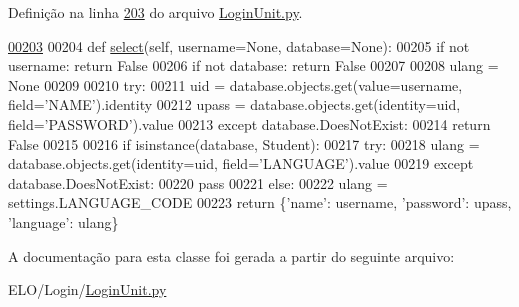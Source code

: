Definição na linha \hyperlink{LoginUnit_8py_source_l00203}{203} do arquivo \hyperlink{LoginUnit_8py_source}{Login\-Unit.\-py}.


\begin{DoxyCode}
\hypertarget{classLogin_1_1LoginUnit_1_1PersLogin_l00203}{}\hyperlink{classLogin_1_1LoginUnit_1_1PersLogin_a1847dbd744377283add2327d2eb0b99f}{00203} 
00204     \textcolor{keyword}{def }\hyperlink{classLogin_1_1LoginUnit_1_1PersLogin_a1847dbd744377283add2327d2eb0b99f}{select}(self, username=None, database=None):
00205         \textcolor{keywordflow}{if} \textcolor{keywordflow}{not} username: \textcolor{keywordflow}{return} \textcolor{keyword}{False}
00206         \textcolor{keywordflow}{if} \textcolor{keywordflow}{not} database: \textcolor{keywordflow}{return} \textcolor{keyword}{False}
00207 
00208         ulang = \textcolor{keywordtype}{None}
00209 
00210         \textcolor{keywordflow}{try}:
00211             uid = database.objects.get(value=username, field=\textcolor{stringliteral}{'NAME'}).identity
00212             upass = database.objects.get(identity=uid, field=\textcolor{stringliteral}{'PASSWORD'}).value
00213         \textcolor{keywordflow}{except} database.DoesNotExist:
00214             \textcolor{keywordflow}{return} \textcolor{keyword}{False}
00215 
00216         \textcolor{keywordflow}{if} isinstance(database, Student):
00217             \textcolor{keywordflow}{try}:
00218                 ulang = database.objects.get(identity=uid, field=\textcolor{stringliteral}{'LANGUAGE'}).value
00219             \textcolor{keywordflow}{except} database.DoesNotExist:
00220                 \textcolor{keywordflow}{pass}
00221         \textcolor{keywordflow}{else}:
00222             ulang = settings.LANGUAGE\_CODE
00223 
        \textcolor{keywordflow}{return} \{\textcolor{stringliteral}{'name'}: username, \textcolor{stringliteral}{'password'}: upass, \textcolor{stringliteral}{'language'}: ulang\}\end{DoxyCode}


A documentação para esta classe foi gerada a partir do seguinte arquivo\-:\begin{DoxyCompactItemize}
\item 
E\-L\-O/\-Login/\hyperlink{LoginUnit_8py}{Login\-Unit.\-py}\end{DoxyCompactItemize}
